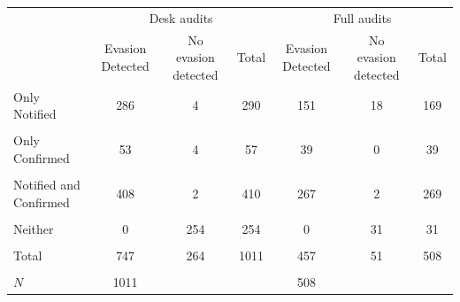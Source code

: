{
\def\sym#1{\ifmmode^{#1}\else\(^{#1}\)\fi}
\begin{tabular}{l*{6}{c}}
\toprule
            &\multicolumn{3}{c}{Desk audits}                                  &\multicolumn{3}{c}{Full audits}                                  \\
            &Evasion Detected         &No evasion detected         &       Total         &Evasion Detected         &No evasion detected         &       Total         \\
\midrule
Only Notified&         286         &           4         &         290         &         151         &          18         &         169         \\
            &                     &                     &                     &                     &                     &                     \\
\addlinespace
Only Confirmed&          53         &           4         &          57         &          39         &           0         &          39         \\
            &                     &                     &                     &                     &                     &                     \\
\addlinespace
Notified and Confirmed&         408         &           2         &         410         &         267         &           2         &         269         \\
            &                     &                     &                     &                     &                     &                     \\
\addlinespace
Neither     &           0         &         254         &         254         &           0         &          31         &          31         \\
            &                     &                     &                     &                     &                     &                     \\
\addlinespace
Total       &         747         &         264         &        1011         &         457         &          51         &         508         \\
            &                     &                     &                     &                     &                     &                     \\
\midrule
\(N\)       &        1011         &                     &                     &         508         &                     &                     \\
\bottomrule
\end{tabular}
}
